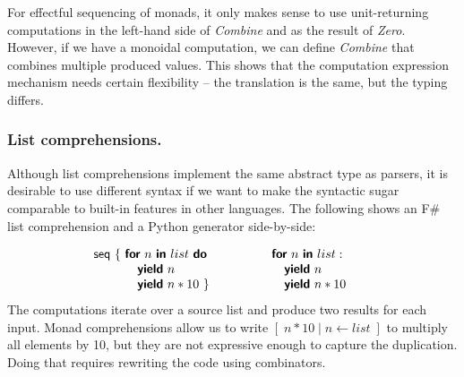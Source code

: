 \documentclass[runningheads,a4paper]{llncs}
\begin{document}
For effectful sequencing of monads, it only makes sense to use unit-returning computations in the left-hand
side of \emph{Combine} and as the result of \emph{Zero}. However, if we have a monoidal computation, we
can define \emph{Combine} that combines multiple produced values. This shows that the computation 
expression mechanism needs certain flexibility -- the translation is the same, but the typing differs.

\subsubsection{List comprehensions.} Although list comprehensions implement the same abstract type
as parsers, it is desirable to use different syntax if we want to make the syntactic sugar comparable to 
built-in features in other languages. The following shows an F\# list comprehension and a Python generator
side-by-side:

\vspace{-0.2em}
\begin{equation*}
\hspace{-2em}
\begin{array}{l}
\ident{seq}~\{~ \kvd{for}~n~\kvd{in}~list~\kvd{do}  \\
\hspace{3.5em}  \kvd{yield}~n          \\
\hspace{3.5em}  \kvd{yield}~n*10 ~\}
\end{array}
\qquad\qquad
\begin{array}{l}
\kvd{for}~n~\kvd{in}~list:  \\
\quad \kvd{yield}~n          \\
\quad \kvd{yield}~n*10
\end{array}
\vspace{-0.2em}
\end{equation*}
%
The computations iterate over a source list and produce two results for each input. 
Monad comprehensions \cite{monad-compre} allow us to write $[\;n*10\;|\;n\leftarrow list\;]$
to multiply all elements by 10, but they are not expressive enough to capture the duplication. 
Doing that requires rewriting the code using combinators.
\end{document}
